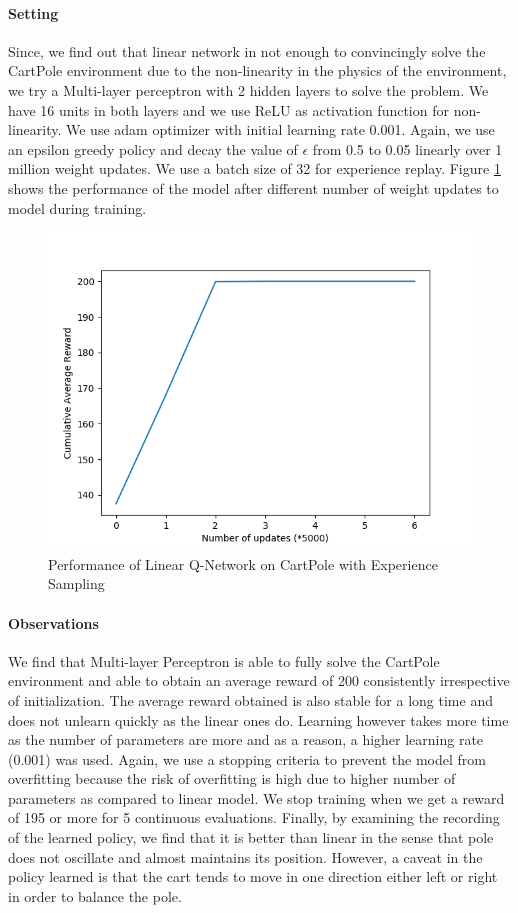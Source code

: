 \documentclass[12pt]{article}
\begin{document}
\paragraph{Setting} Since, we find out that linear network in not enough to convincingly solve the CartPole environment due to the non-linearity in the physics of the environment, we try a Multi-layer perceptron with 2 hidden layers to solve the problem. We have 16 units in both layers and we use ReLU as activation function for non-linearity. We use adam optimizer with initial learning rate 0.001. Again, we use an epsilon greedy policy and decay the value of $\epsilon$ from 0.5 to 0.05 linearly over 1 million weight updates. We use a batch size of 32 for experience replay. Figure \ref{fig:03} shows the performance of the model after different number of weight updates to model during training.
\begin{figure}[h]
  \centering
  \vspace{-5mm}
  \includegraphics[width=0.8\linewidth]{figures/reward_plot_04.png}
  \caption{Performance of Linear Q-Network on CartPole with Experience Sampling}
  \label{fig:03}
\end{figure}
\paragraph{Observations} We find that Multi-layer Perceptron is able to fully solve the CartPole environment and able to obtain an average reward of 200 consistently irrespective of initialization. The average reward obtained is also stable for a long time and does not unlearn quickly as the linear ones do. Learning however takes more time as the number of parameters are more and as a reason, a higher learning rate (0.001) was used. Again, we use a stopping criteria to prevent the model from overfitting because the risk of overfitting is high due to higher number of parameters as compared to linear model. We stop training when we get a reward of 195 or more for 5 continuous evaluations. Finally, by examining the recording of the learned policy, we find that it is better than linear in the sense that pole does not oscillate and almost maintains its position. However, a caveat in the policy learned is that the cart tends to move in one direction either left or right in order to balance the pole.
\end{document}
